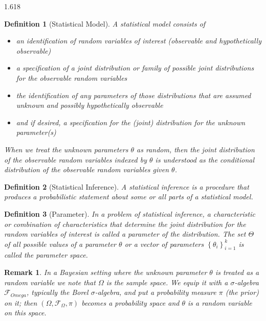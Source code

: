 \documentclass[11pt, oneside]{book}   	%
\newtheorem{definition}{Definition}[chapter]
\newtheorem{remark}{Remark}[chapter]
\newcommand{\set}[1]{\left\{#1\right\}}
\begin{document}
\begin{spacing}{1.618}
		\begin{definition}[Statistical Model]
			A \emph{statistical model} consists of
			\begin{itemize}
				\item an identification of random variables of interest (observable and hypothetically observable)
				\item a specification of a joint distribution or family of possible joint distributions for the observable random variables 
				\item the identification of any parameters of those distributions that are assumed unknown and possibly hypothetically observable
				\item and if desired, a specification for the (joint) distribution for the unknown parameter(s)
			\end{itemize}
			When we treat the unknown parameters $\theta$ as random, then the joint distribution of the observable random variables indexed by $\theta$ is understood as the conditional distribution of the observable random variables given $\theta$. 
		\end{definition}
		
		\begin{definition}[Statistical Inference]
			A \emph{statistical inference} is a procedure that produces a probabilistic statement about some or all parts of a statistical model.
		\end{definition}
		
		\begin{definition}[Parameter]
			In a problem of statistical inference, a characteristic or combination of characteristics that determine the joint distribution for the random variables of interest is called a parameter of the distribution. The set $\Theta$ of all possible values of a parameter $\theta$ or a vector of parameters $\set{\theta_i}_{i=1}^k$ is called the \emph{parameter space}. 
		\end{definition}

		\begin{remark}
			In a Bayesian setting where the unknown parameter $\theta$ is treated as a random variable we note that $\Omega$ is the sample space. We equip it with a $\sigma$-algebra $\mathcal{F}_{Omega}$, typically the Borel $\sigma$-algebra, and put a probability measure $\pi$ (the prior) on it; then $(\Omega, \mathcal{F}_\Omega, \pi)$ becomes a probability space and $\theta$ is a random variable on this space. 
		\end{remark}
		

\end{spacing}
\end{document}
